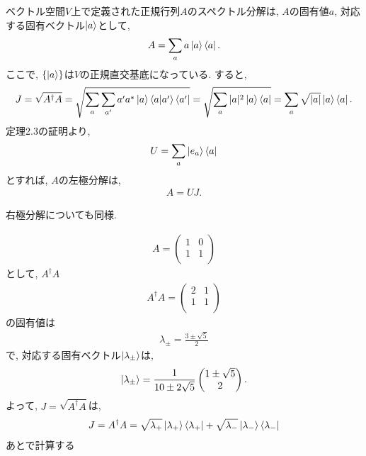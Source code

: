 \begin{ex}
    \label{ex2.49}
    ベクトル空間$V$上で定義された正規行列$A$のスペクトル分解は,
    $A$の固有値$a$, 対応する固有ベクトル$\ket{a}$として,
    \begin{align*}
        A = \sum_a a \ket{a} \bra{a} .
    \end{align*}
    ここで, $\{ \ket{a} \}$は$V$の正規直交基底になっている.
    すると,
    \begin{align*}
        J
        =
        \sqrt{A^\dagger A}
        =
        \sqrt{\sum_a \sum_{a'} a' a^* \ket{a}\braket{a|a'}  \bra{a'}}
        =
        \sqrt{\sum_a |a|^2 \ket{a} \bra{a}}
        =
        \sum_a \sqrt{|a|} \ket{a} \bra{a} .
    \end{align*}
    定理2.3の証明より,
    \begin{align*}
        U = \sum_a \ket{e_a} \bra{a}
    \end{align*}
    とすれば, $A$の左極分解は,
    \begin{align*}
        A = UJ .
    \end{align*}
    \par
    右極分解についても同様.
\end{ex}

\begin{ex}
    \label{ex2.50}
    \begin{align*}
        A
        =
        \begin{pmatrix}
            1 & 0 \\
            1 & 1 \\
        \end{pmatrix}
    \end{align*}
    として, $A^\dagger A$
    \begin{align*}
        A^\dagger A
        =
        \begin{pmatrix}
            2 & 1 \\
            1 & 1 \\
        \end{pmatrix}
    \end{align*}
    の固有値は
    \begin{align*}
        \lambda_{\pm} = \frac{3 \pm \sqrt{5}}{2}
    \end{align*}
    で, 対応する固有ベクトル$\ket{\lambda_{\pm}}$は,
    \begin{align*}
        \ket{\lambda_\pm}
        =
        \frac{1}{10\pm2\sqrt{5}}
        \begin{pmatrix}
            1 \pm \sqrt{5} \\ 2
        \end{pmatrix}.
    \end{align*}
    よって, $J = \sqrt{A^\dagger A}$は,
    \begin{align*}
        J = A^\dagger A
        = \sqrt{\lambda_+} \ket{\lambda_+} \bra{\lambda_+} + \sqrt{\lambda_-}\ket{\lambda_-} \bra{\lambda_-}
    \end{align*}
    あとで計算する
\end{ex}

